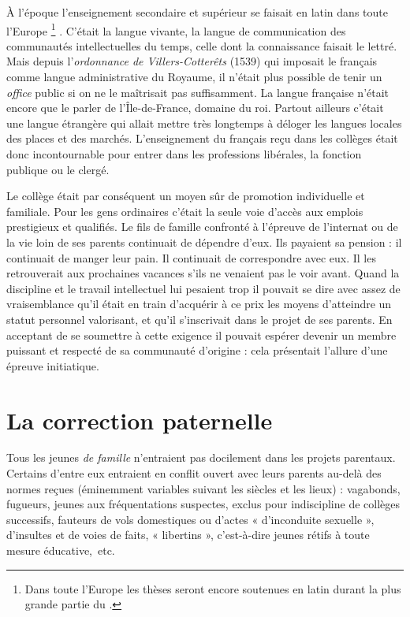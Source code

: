 À l'époque l'enseignement secondaire et supérieur se faisait en latin dans toute l'Europe%
\footnote{Dans toute l'Europe les thèses seront encore soutenues en latin durant la plus grande partie du .}%
. C'était la langue vivante, la langue de communication des communautés intellectuelles du temps, celle dont la connaissance faisait le lettré. Mais depuis l'\emph{ordonnance de Villers-Cotterêts} (1539) qui imposait le français comme langue administrative du Royaume, il n'était plus possible de tenir un \emph{office} public si on ne le maîtrisait pas suffisamment. La langue française n'était encore que le parler de l'Île-de-France, domaine du roi. Partout ailleurs c'était une langue étrangère qui allait mettre très longtemps à déloger les langues locales des places et des marchés. L'enseignement du français reçu dans les collèges était donc incontournable pour entrer dans les professions libérales, la fonction publique ou le clergé. 

 Le collège était par conséquent un moyen sûr de promotion individuelle et familiale. Pour les gens ordinaires c'était la seule voie d'accès aux emplois prestigieux et qualifiés. Le fils de famille confronté à l'épreuve de l'internat ou de la vie loin de ses parents continuait de dépendre d'eux. Ils payaient sa pension : il continuait de manger leur pain. Il continuait de correspondre avec eux. Il les retrouverait aux prochaines vacances s'ils ne venaient pas le voir avant. Quand la discipline et le travail intellectuel lui pesaient trop il pouvait se dire avec assez de vraisemblance qu'il était en train d'acquérir à ce prix les moyens d'atteindre un statut personnel valorisant, et qu'il s'inscrivait dans le projet de ses parents. En acceptant de se soumettre à cette exigence il pouvait espérer devenir un membre puissant et respecté de sa communauté d'origine : cela présentait l'allure d'une épreuve initiatique. 

\section{La correction paternelle}

 Tous les jeunes \emph{de famille} n'entraient pas docilement dans les projets parentaux. Certains d'entre eux entraient en conflit ouvert avec leurs parents au-delà des normes reçues (éminemment variables suivant les siècles et les lieux) : vagabonds, fugueurs, jeunes aux fréquentations suspectes, exclus pour indiscipline de collèges successifs, fauteurs de vols domestiques ou d'actes « d'inconduite sexuelle », d'insultes et de voies de faits, « libertins », c'est-à-dire jeunes rétifs à toute mesure éducative,~etc. 


